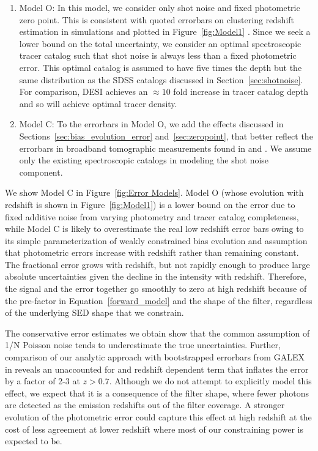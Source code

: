 \documentclass[fleqn,usenatbib]{mnras}
\begin{document}
\begin{enumerate}
    \item Model O: In this model, we consider only shot noise and fixed photometric zero point. This is consistent with quoted errorbars on clustering redshift estimation in simulations and plotted in Figure~\ref{fig:Model1} \citep{Rahman2015}. Since we seek a lower bound on the total uncertainty, we consider an optimal spectroscopic tracer catalog such that shot noise is always less than a fixed photometric error. This optimal catalog is assumed to have five times the depth but the same distribution as the SDSS catalogs discussed in Section~\ref{sec:shotnoise}. For comparison, DESI achieves an $\approx 10$ fold increase in tracer catalog depth and so will achieve optimal tracer density. 
    \item Model C: To the errorbars in Model O, we add the effects discussed in Sections~\ref{sec:bias_evolution_error} and~\ref{sec:zeropoint}, that better reflect the errorbars in broadband tomographic measurements found in \citep{Chiang_2019} and \citep{Chiang20}. We assume only the existing spectroscopic catalogs in modeling the shot noise component. 
\end{enumerate}


We show Model C in Figure~\ref{fig:Error Models}. Model O (whose evolution with redshift is shown in Figure~\ref{fig:Model1}) is a lower bound on the error due to fixed additive noise from varying photometry and tracer catalog completeness, while Model C is likely to overestimate the real low redshift error bars owing to its simple parameterization of weakly constrained bias evolution and assumption that photometric errors increase with redshift rather than remaining constant. The fractional error grows with redshift, but not rapidly enough to produce large absolute uncertainties given the decline in the intensity with redshift. Therefore, the signal and the error together go smoothly to zero at high redshift because of the pre-factor in Equation~\ref{forward_model} and the shape of the filter, regardless of the underlying SED shape that we constrain. 

The conservative error estimates we obtain show that the common assumption of 1/N Poisson noise \citep{Scottez18} tends to underestimate the true uncertainties. Further, comparison of our analytic approach with bootstrapped errorbars from GALEX in \cite{Chiang_2019} reveals an unaccounted for and redshift dependent term that inflates the error by a factor of 2-3 at $z > 0.7$. Although we do not attempt to explicitly model this effect, we expect that it is a consequence of the filter shape, where fewer photons are detected as the emission redshifts out of the filter coverage. A stronger evolution of the photometric error could capture this effect at high redshift at the cost of less agreement at lower redshift where most of our constraining power is expected to be.
\end{document}
